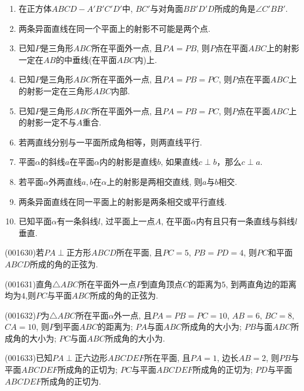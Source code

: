 \begin{enumerate}[\blank{30}(1)]
\item 在正方体$ABCD-A'B'C'D'$中, $BC'$与对角面$BB'D'D$所成的角是$\angle C'BB'$.\\ 
\item 两条异面直线在同一个平面上的射影不可能是两个点.\\ 
\item 已知$P$是三角形$ABC$所在平面外一点, 且$PA=PB$, 则$P$点在平面$ABC$上的射影一定在$AB$的中垂线(在平面$ABC$内)上.\\ 
\item 已知$P$是三角形$ABC$所在平面外一点, 且$PA=PB=PC$, 则$P$点在平面$ABC$上的射影一定在三角形$ABC$内部.\\ 
\item 已知$P$是三角形$ABC$所在平面外一点, 且$PA=PB=PC$, 则$P$点在平面$ABC$上的射影一定不与$A$重合.\\ 
\item 若两直线分别与一平面所成角相等，则两直线平行.\\ 
\item 平面$\alpha$的斜线$a$在平面$\alpha$内的射影是直线$b$, 如果直线$c\perp b$，那么$c\perp a$.\\ 
\item 若平面$\alpha$外两直线$a,b$在$\alpha$上的射影是两相交直线, 则$a$与$b$相交.\\ 
\item 两条异面直线在同一平面上的射影是两条相交或平行直线.\\ 
\item 已知平面$\alpha$有一条斜线$l$, 过平面上一点$A$, 在平面$\alpha$内有且只有一条直线与斜线$l$垂直.\\ 
\end{enumerate}
\item (001630)若$PA\perp$正方形$ABCD$所在平面, 且$PC=5$, $PB=PD=4$, 则$PC$和平面$ABCD$所成的角的正弦为.
\item (001631)直角$\triangle ABC$所在平面外一点$P$到直角顶点$C$的距离为$5$, 到两直角边的距离均为$4$,则$PC$与平面$ABC$所成的角的正弦为.
\item (001632)$P$为$\triangle ABC$所在平面$\alpha$外一点, 且$PA=PB=PC=10$, $AB=6$, $BC=8$, $CA=10$, 则$P$到平面$ABC$的距离为; $PA$与面$ABC$所成角的大小为; $PB$与面$ABC$所成角的大小为; $PC$与面$ABC$所成角的大小为.
\item (001633)已知$PA\perp$正六边形$ABCDEF$所在平面, 且$PA=1$, 边长$AB=2$, 则$PB$与平面$ABCDEF$所成角的正切为; $PC$与平面$ABCDEF$所成角的正切为; $PD$与平面$ABCDEF$所成角的正切为.
